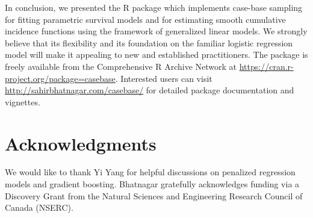 In conclusion, we presented the R package  which
implements case-base sampling for fitting parametric survival models and
for estimating smooth cumulative incidence functions using the framework
of generalized linear models. We strongly believe that its flexibility
and its foundation on the familiar logistic regression model will make
it appealing to new and established practitioners. The 
package is freely available from the Comprehensive R Archive Network at
\url{https://cran.r-project.org/package=casebase}. Interested users can
visit \url{http://sahirbhatnagar.com/casebase/} for detailed package
documentation and vignettes.

\hypertarget{acknowledgments}{%
\section{Acknowledgments}\label{acknowledgments}}

We would like to thank Yi Yang for helpful discussions on penalized
regression models and gradient boosting. \mbox{Bhatnagar} gratefully
acknowledges funding via a Discovery Grant from the Natural Sciences and
Engineering Research Council of Canada (NSERC).



\address{%
Sahir Rai Bhatnagar*\\
McGill University\\%
1020 Pine Avenue West Montreal, QC, Canada H3A 1A2\\
%
\url{http://sahirbhatnagar.com/}\\%
%
%
}

\address{%
Maxime Turgeon*\\
University of Manitoba\\%
186 Dysart Road Winnipeg, MB, Canada R3T 2N2\\
%
\url{https://maxturgeon.ca/}\\%
%
%
}

\address{%
Jesse Islam\\
McGill University\\%
1020 Pine Avenue West Montreal, QC, Canada H3A 1A2\\
%
%
%
%
}

\address{%
James A. Hanley\\
McGill University\\%
1020 Pine Avenue West Montreal, QC, Canada H3A 1A2\\
%
\url{http://www.medicine.mcgill.ca/epidemiology/hanley/}\\%
%
%
}

\address{%
Olli Saarela\\
University of Toronto\\%
Dalla Lana School of Public Health, 155 College Street, 6th floor,
Toronto, Ontario M5T 3M7, Canada\\
%
\url{http://individual.utoronto.ca/osaarela/}\\%
%
%
}
